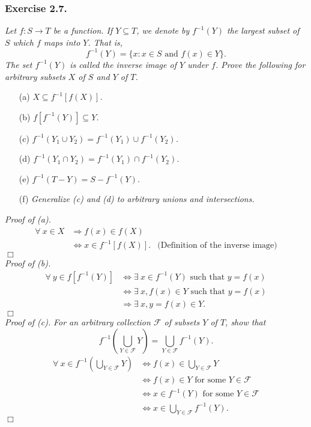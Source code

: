 \documentclass{article}
\begin{document}
\subsubsection*{Exercise 2.7.}
\emph{Let $f: S \rightarrow T$ be a function.
If $Y \subseteq T$,
we denote by $f^{-1}(Y)$ the largest subset of $S$ which $f$ maps into $Y$.
That is,
$$f^{-1}(Y) = \{ x : x \in S \text{ and } f(x) \in Y \}.$$
The set $f^{-1}(Y)$ is called the inverse image of $Y$ under $f$.
Prove the following for arbitrary subsets $X$ of $S$ and $Y$ of $T$.}
\begin{enumerate}
\item[(a)]
\emph{$X \subseteq f^{-1}[f(X)]$.}
\item[(b)]
\emph{$f[f^{-1}(Y)] \subseteq Y$.}
\item[(c)]
\emph{$f^{-1}(Y_1 \cup Y_2) = f^{-1}(Y_1) \cup f^{-1}(Y_2)$.}
\item[(d)]
\emph{$f^{-1}(Y_1 \cap Y_2) = f^{-1}(Y_1) \cap f^{-1}(Y_2)$.}
\item[(e)]
\emph{$f^{-1}(T - Y) = S - f^{-1}(Y)$.}
\item[(f)]
\emph{Generalize (c) and (d) to arbitrary unions and intersections.} \\
\end{enumerate}

\emph{Proof of (a).}
\begin{align*}
  \forall \: x \in X
  &\Longrightarrow
  f(x) \in f(X)
    & \\
  &\Longleftrightarrow
  x \in f^{-1}[f(X)].
    &\text{(Definition of the inverse image)}
\end{align*}
$\Box$ \\

\emph{Proof of (b).}
\begin{align*}
  \forall \: y \in f[f^{-1}(Y)]
  &\Longleftrightarrow
  \exists \: x \in f^{-1}(Y) \text{ such that } y = f(x) \\
  &\Longleftrightarrow
  \exists \: x, f(x) \in Y \text{ such that } y = f(x) \\
  &\Longrightarrow
  \exists \: x, y = f(x) \in Y.
\end{align*}
$\Box$ \\

\emph{Proof of (c).}
\emph{For an arbitrary collection $\mathscr{F}$ of subsets $Y$ of $T$,
show that
$$f^{-1}\left( \bigcup_{Y \in \mathscr{F}} Y \right)
= \bigcup_{Y \in \mathscr{F}} f^{-1}(Y).$$}
\begin{align*}
  \forall \: x \in f^{-1}\left( \bigcup_{Y \in \mathscr{F}} Y \right)
  &\Longleftrightarrow
  f(x) \in \bigcup_{Y \in \mathscr{F}} Y \\
  &\Longleftrightarrow
  f(x) \in Y \text{ for some } Y \in \mathscr{F} \\
  &\Longleftrightarrow
  x \in f^{-1}(Y) \text{ for some } Y \in \mathscr{F} \\
  &\Longleftrightarrow
  x \in \bigcup_{Y \in \mathscr{F}} f^{-1}(Y).
\end{align*}
$\Box$ \\
\end{document}
